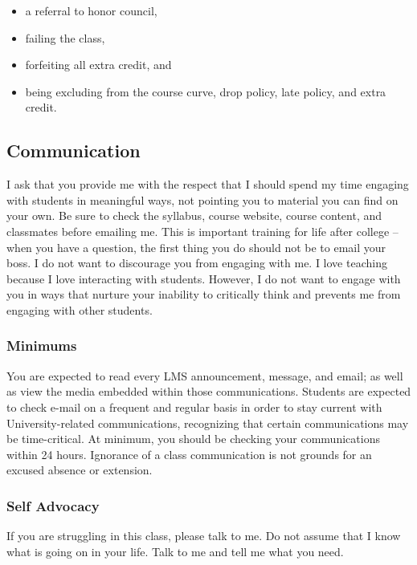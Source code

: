 \documentclass[11pt,]{article}
\providecommand{\tightlist}{%
  \setlength{\itemsep}{0pt}\setlength{\parskip}{0pt}}
\begin{document}
\begin{itemize}
\tightlist
\item
  a referral to honor council,
\item
  failing the class,
\item
  forfeiting all extra credit, and
\item
  being excluding from the course curve, drop policy, late policy, and
  extra credit.
\end{itemize}

\hypertarget{communication}{%
\subsection{Communication}\label{communication}}

I ask that you provide me with the respect that I should spend my time
engaging with students in meaningful ways, not pointing you to material
you can find on your own. Be sure to check the syllabus, course website,
course content, and classmates before emailing me. This is important
training for life after college -- when you have a question, the first
thing you do should not be to email your boss. I do not want to
discourage you from engaging with me. I love teaching because I love
interacting with students. However, I do not want to engage with you in
ways that nurture your inability to critically think and prevents me
from engaging with other students.

\hypertarget{minimums}{%
\subsubsection{Minimums}\label{minimums}}

You are expected to read every LMS announcement, message, and email; as
well as view the media embedded within those communications. Students
are expected to check e-mail on a frequent and regular basis in order to
stay current with University-related communications, recognizing that
certain communications may be time-critical. At minimum, you should be
checking your communications within 24 hours. Ignorance of a class
communication is not grounds for an excused absence or extension.

\hypertarget{self-advocacy}{%
\subsubsection{Self Advocacy}\label{self-advocacy}}

If you are struggling in this class, please talk to me. Do not assume
that I know what is going on in your life. Talk to me and tell me what
you need.
\end{document}
